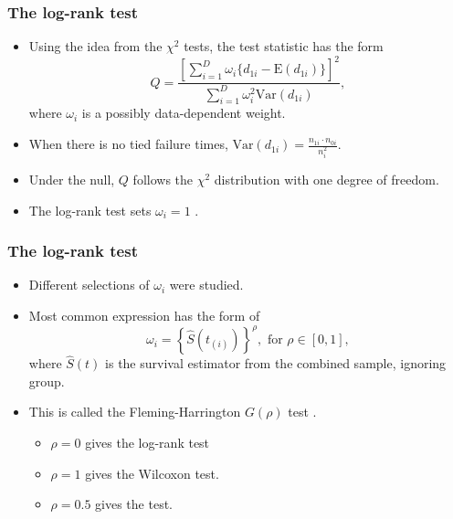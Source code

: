 \documentclass[10pt]{beamer}\usepackage[]{graphicx}\usepackage[]{color}
\newcommand{\Var}{\mathrm{Var}}
\newcommand{\E}{\mathrm{E}}
\begin{document}
\begin{frame}
  \frametitle{The log-rank test}
  \begin{itemize}
  \item Using the idea from the $\chi^2$ tests, the test statistic has the form 
    \begin{equation}
      \label{eq:chi}
      Q = \frac{\left[\sum_{i = 1}^D\omega_i\{d_{1i} - \E(d_{1i})\}\right]^2}{\sum_{i = 1}^D\omega_i^2\Var(d_{1i})},
  \end{equation}
  where $\omega_i$ is a possibly data-dependent weight.
\item When there is no tied failure times, $\Var(d_{1i}) = \frac{n_{1i}\cdot n_{0i}}{n_i^2}$.
\item Under the null, $Q$ follows the $\chi^2$ distribution with one degree of freedom. 
  \item The log-rank test sets $\omega_i = 1$ \citep{peto1972asymptotically}.
  \end{itemize}
\end{frame}    

\begin{frame}
  \frametitle{The log-rank test}
  \begin{itemize}
  \item Different selections of $\omega_i$ were studied. 
  \item Most common expression has the form of
    $$ \omega_i = \left\{\hat{S}(t_{(i)})\right\}^\rho, \mbox{ for }\rho \in [0, 1],$$
    where $\hat{S}(t)$ is the survival estimator from the combined sample, ignoring group.
  \item This is called the Fleming-Harrington $G(\rho)$ test \citep[e.g.][]{cox1984analysis, fleming1987supremum}.
    \begin{itemize}
    \item $\rho = 0$ gives the log-rank test
    \item $\rho = 1$ gives the Wilcoxon test.
    \item $\rho = 0.5$ gives the \citet{tarone1977distribution} test.
    \end{itemize}
  \end{itemize}
\end{frame}
\end{document}
